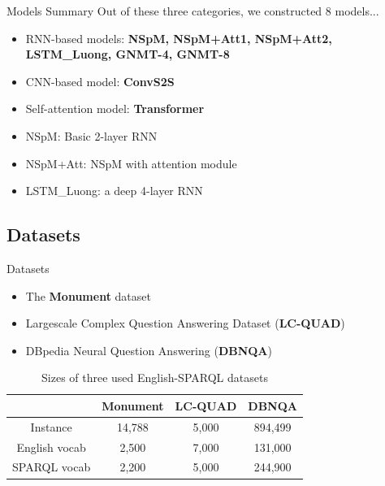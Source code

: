 \documentclass[11pt]{beamer}
\begin{document}
\begin{frame}{Models Summary}
    Out of these three categories, we constructed 8 models...
    \begin{itemize}
        \item RNN-based models: \textbf{NSpM, NSpM+Att1, NSpM+Att2, LSTM\_Luong, GNMT-4, GNMT-8}
        \item CNN-based model: \textbf{ConvS2S}
        \item Self-attention model: \textbf{Transformer}
    \end{itemize}
    \medskip

    \begin{itemize}
        \item NSpM: Basic 2-layer RNN
        \item NSpM+Att: NSpM with attention module
        \item LSTM\_Luong: a deep 4-layer RNN
    \end{itemize}
    
\end{frame}

\subsection{Datasets}

\begin{frame}{Datasets}
    \begin{itemize}
        \item The \textbf{Monument} dataset 
        \item Largescale Complex Question Answering Dataset (\textbf{LC-QUAD})
        \item DBpedia Neural Question Answering (\textbf{DBNQA})
    \end{itemize}
    \pause
    \begin{table}
        \begin{tabular}{|c|c|c|c|}
            \hline
            & Monument & LC-QUAD & DBNQA \\
            \hline
            Instance & 14,788 & 5,000 & 894,499 \\
            \hline
            English vocab & 2,500 & 7,000 & 131,000 \\
            \hline
            SPARQL vocab & 2,200 & 5,000 & 244,900 \\
            \hline
        \end{tabular}
        \caption{Sizes of three used English-SPARQL datasets}
    \end{table}
\end{frame}
\end{document}
